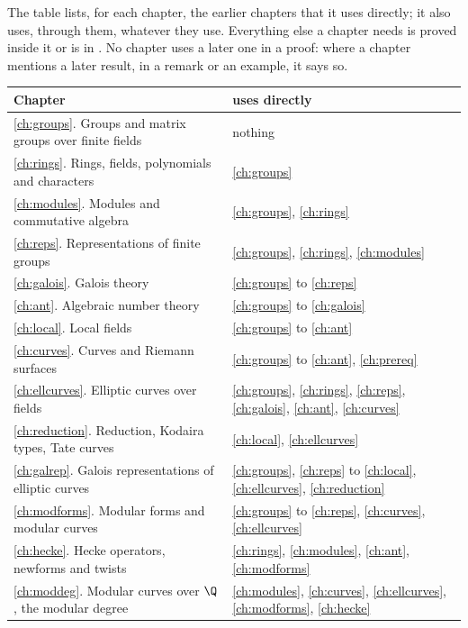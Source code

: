 The table lists, for each chapter, the earlier chapters that it uses directly; it also uses,
through them, whatever they use. Everything else a chapter needs is proved inside it or is in
. No chapter uses a later one in a proof: where a chapter mentions a later result,
in a remark or an example, it says so.

\begin{center}
\small
\begin{tabular}{@{}p{}p{}@{}}
\toprule
Chapter & uses directly \\
\midrule
\ref{ch:groups}. Groups and matrix groups over finite fields & nothing \\
\ref{ch:rings}. Rings, fields, polynomials and characters & \ref{ch:groups} \\
\ref{ch:modules}. Modules and commutative algebra & \ref{ch:groups}, \ref{ch:rings} \\
\ref{ch:reps}. Representations of finite groups & \ref{ch:groups}, \ref{ch:rings}, \ref{ch:modules} \\
\ref{ch:galois}. Galois theory & \ref{ch:groups} to \ref{ch:reps} \\
\ref{ch:ant}. Algebraic number theory & \ref{ch:groups} to \ref{ch:galois} \\
\ref{ch:local}. Local fields & \ref{ch:groups} to \ref{ch:ant} \\
\ref{ch:curves}. Curves and Riemann surfaces & \ref{ch:groups} to \ref{ch:ant}, \ref{ch:prereq} \\
\ref{ch:ellcurves}. Elliptic curves over fields & \ref{ch:groups}, \ref{ch:rings}, \ref{ch:reps}, \ref{ch:galois}, \ref{ch:ant}, \ref{ch:curves} \\
\ref{ch:reduction}. Reduction, Kodaira types, Tate curves & \ref{ch:local}, \ref{ch:ellcurves} \\
\ref{ch:galrep}. Galois representations of elliptic curves & \ref{ch:groups}, \ref{ch:reps} to \ref{ch:local}, \ref{ch:ellcurves}, \ref{ch:reduction} \\
\ref{ch:modforms}. Modular forms and modular curves & \ref{ch:groups} to \ref{ch:reps}, \ref{ch:curves}, \ref{ch:ellcurves} \\
\ref{ch:hecke}. Hecke operators, newforms and twists & \ref{ch:rings}, \ref{ch:modules}, \ref{ch:ant}, \ref{ch:modforms} \\
\ref{ch:moddeg}. Modular curves over $\Q$, the modular degree & \ref{ch:modules}, \ref{ch:curves}, \ref{ch:ellcurves}, \ref{ch:modforms}, \ref{ch:hecke} \\

\end{tabular}
\end{center}
